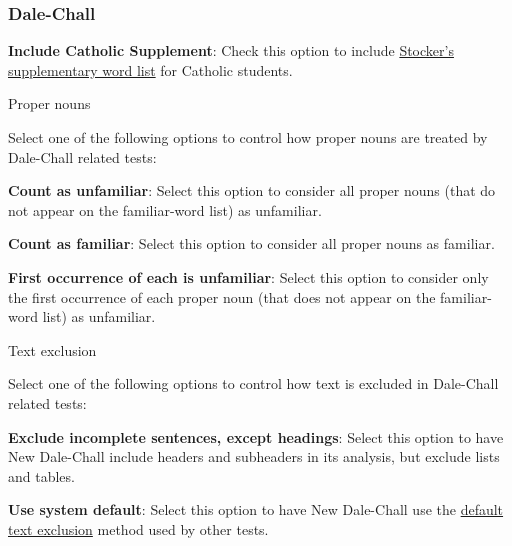 \documentclass[
]{book}
\newenvironment{optionssection}
    {
    \begin{tcolorbox}[colframe=lightgray,colback=ultralightgray,sharp corners=all,parbox=false]
    }
    {
    \end{tcolorbox}
    }
\newenvironment{optionssectiontitle}
    {
    \begin{tcolorbox}[colframe=lightgray,colback=lightgray]
    \bfseries
    }
    {
    \end{tcolorbox}
    }
\theoremstyle{definition}
\theoremstyle{definition}
\theoremstyle{definition}
\theoremstyle{definition}
\theoremstyle{remark}
\begin{document}
\hypertarget{options-dale-chall}{%
\subsubsection*{Dale-Chall}\label{options-dale-chall}}

\textbf{Include Catholic Supplement}: Check this option to include \protect\hyperlink{stocker-catholic-supplement}{Stocker's supplementary word list} for Catholic students.

\begin{optionssection}

\begin{optionssectiontitle}
Proper nouns

\end{optionssectiontitle}

Select one of the following options to control how proper nouns are treated by Dale-Chall related tests:

\textbf{Count as unfamiliar}: Select this option to consider all proper nouns (that do not appear on the familiar-word list) as unfamiliar.

\textbf{Count as familiar}: Select this option to consider all proper nouns as familiar.

\textbf{First occurrence of each is unfamiliar}: Select this option to consider only the first occurrence of each proper noun (that does not appear on the familiar-word list) as unfamiliar.

\end{optionssection}

\begin{optionssection}

\begin{optionssectiontitle}
Text exclusion

\end{optionssectiontitle}

Select one of the following options to control how text is excluded in Dale-Chall related tests:

\textbf{Exclude incomplete sentences, except headings}: Select this option to have New Dale-Chall include headers and subheaders in its analysis, but exclude lists and tables.

\textbf{Use system default}: Select this option to have New Dale-Chall use the \protect\hyperlink{options-text-exclusion}{default text exclusion} method used by other tests.

\end{optionssection}
\end{document}
